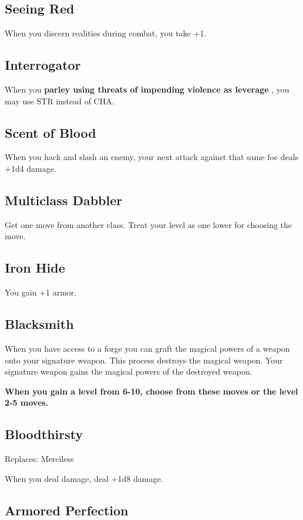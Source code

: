 \subsection{Seeing Red}


 When you discern realities during combat, you take +1.
\subsection{Interrogator}


 When you \textbf{parley using threats of impending violence as leverage}
, you may use STR instead of CHA.
\subsection{Scent of Blood}


 When you hack and slash an enemy, your next attack against that same foe deals +1d4 damage.
\subsection{Multiclass Dabbler}


 Get one move from another class. Treat your level as one lower for choosing the move.
\subsection{Iron Hide}


 You gain +1 armor.
\subsection{Blacksmith}


 When you have access to a forge you can graft the magical powers of a weapon onto your signature weapon. This process destroys the magical weapon. Your signature weapon gains the magical powers of the destroyed weapon.


\vspace{\baselineskip}
{\bfseries When you gain a level from 6-10, choose from these moves or the level 2-5 moves.}
\subsection{Bloodthirsty}


 Replaces: Merciless


 When you deal damage, deal +1d8 damage.
\subsection{Armored Perfection}


